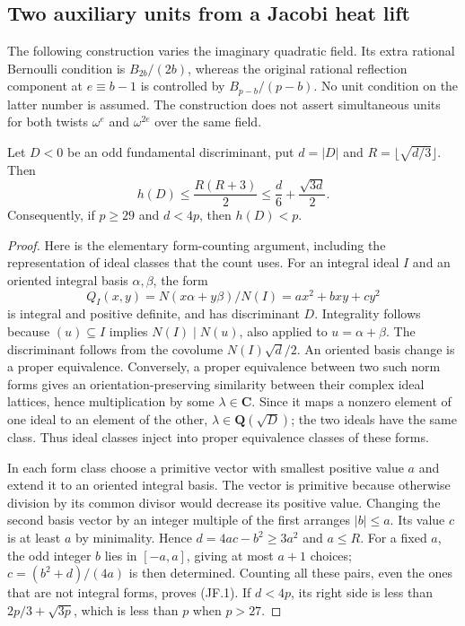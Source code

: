 \subsection{Two auxiliary units from a Jacobi heat lift}
\label{sec:kt-jacobi-fields}

The following construction varies the imaginary quadratic field.  Its
extra rational Bernoulli condition is $B_{2b}/(2b)$, whereas the
original rational reflection component at $e\equiv b-1$ is controlled
by $B_{p-b}/(p-b)$.  No unit condition on the latter number is assumed.
The construction does not assert simultaneous units for both twists
$\omega^e$ and $\omega^{2e}$ over the same field.

\begin{lemma}
Let $D<0$ be an odd fundamental discriminant, put $d=|D|$ and
$R=\lfloor\sqrt{d/3}\rfloor$.  Then
\[
 h(D)\leq\frac{R(R+3)}2
       \leq\frac d6+\frac{\sqrt{3d}}2.                 \tag{JF.1}
\]
Consequently, if $p\geq29$ and $d<4p$, then $h(D)<p$.
\end{lemma}
\begin{proof}
Here is the elementary form-counting argument, including the
representation of ideal classes that the count uses.  For an integral
ideal $I$ and an oriented integral basis $\alpha,\beta$, the form
\[
 Q_I(x,y)=N(x\alpha+y\beta)/N(I)=ax^2+bxy+cy^2
\]
is integral and positive definite, and has discriminant $D$.
Integrality follows because $(u)\subseteq I$ implies $N(I)\mid N(u)$,
also applied to $u=\alpha+\beta$.  The discriminant follows from
the covolume $N(I)\sqrt d/2$.  An oriented basis change is a proper
equivalence.  Conversely, a proper equivalence between two such norm
forms gives an orientation-preserving similarity between their complex
ideal lattices, hence multiplication by some $\lambda\in\mathbf C$.
Since it maps a nonzero element of one ideal to an element of the other,
$\lambda\in\mathbf Q(\sqrt D)$; the two ideals have the same class.
Thus ideal classes inject into proper equivalence classes of these forms.

In each form class choose a primitive vector with smallest positive
value $a$ and extend it to an oriented integral basis.  The vector is
primitive because otherwise division by its common divisor would
decrease its positive value.  Changing the second basis vector by an
integer multiple of the first arranges $|b|\leq a$.  Its value $c$ is
at least $a$ by minimality.  Hence $d=4ac-b^2\geq3a^2$ and $a\leq R$.
For a fixed $a$, the odd integer $b$ lies in $[-a,a]$, giving at most
$a+1$ choices; $c=(b^2+d)/(4a)$ is then determined.  Counting all these
pairs, even the ones that are not integral forms, proves (JF.1).
If $d<4p$, its right side is less than $2p/3+\sqrt{3p}$, which is
less than $p$ when $p>27$.
\end{proof}

